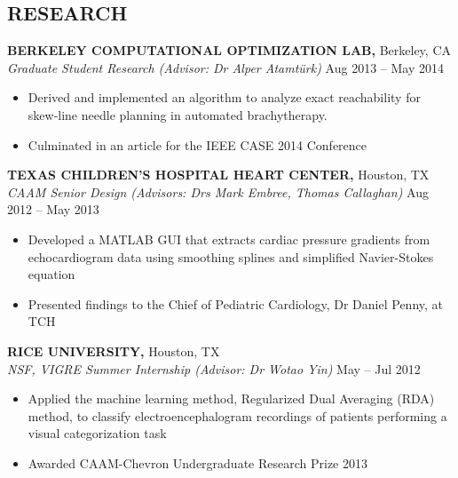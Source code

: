 \documentclass[margin]{res}
\begin{document}
\begin{resume}
\section{RESEARCH}
{\bf BERKELEY COMPUTATIONAL OPTIMIZATION LAB,} Berkeley, CA \\
{\em Graduate Student Research (Advisor: Dr Alper Atamt\"urk)} \hfill
Aug 2013 -- May 2014 \\                                          \vspace{-4mm}
\begin{itemize}                                         \itemsep1pt %
        \item    Derived and implemented an algorithm to analyze exact reachability for skew-line needle planning in automated brachytherapy.         \item     Culminated in an article for the IEEE CASE 2014 Conference
\end{itemize}

{\bf TEXAS CHILDREN'S HOSPITAL HEART CENTER,} Houston, TX \\
{\em CAAM Senior Design (Advisors: Drs Mark Embree, Thomas Callaghan)} \hfill
Aug 2012 -- May 2013 \\                                          \vspace{-4mm}
\begin{itemize}                                         \itemsep1pt %
        \item  Developed a MATLAB GUI that extracts cardiac pressure gradients from echocardiogram data using smoothing splines and simplified Navier-Stokes equation 
        \item  Presented findings to the Chief of Pediatric Cardiology, Dr Daniel Penny, at TCH\end{itemize}
{\bf RICE UNIVERSITY,} Houston, TX \\
{\em NSF, VIGRE Summer Internship (Advisor: Dr Wotao Yin)}    \hfill
May -- Jul 2012 \\                                          \vspace{-4mm}
\begin{itemize}                                         \itemsep1pt 
        \item  Applied the machine learning method, Regularized Dual Averaging (RDA) method, to classify electroencephalogram  recordings of patients performing a visual categorization task
        \item Awarded CAAM-Chevron Undergraduate Research Prize
2013\end{itemize}
\vspace{-2mm}



\end{resume}
\end{document}
